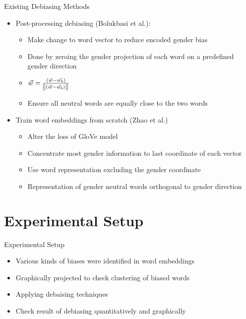 \documentclass{beamer}
\begin{document}
		
		\begin{frame}{Existing Debiasing Methods}
			\begin{itemize}
				\item Post-processing debiasing (Bolukbasi et al.):
				\begin{itemize}
					\item Make change to word vector to reduce encoded gender bias
					\item Done by zeroing the gender projection of each word on a predefined gender direction
					\item $\vec{w} = \frac{(\vec{w} - \vec{w_b})}{\norm{(\vec{w} - \vec{w_b})}}$
					\item Ensure all neutral words are equally close to the two words
				\end{itemize}
				\item Train word embeddings from scratch (Zhao et al.)
				\begin{itemize}
					\item Alter the loss of GloVe model
					\item Concentrate most gender information to last coordinate of each vector
					\item Use word representation excluding the gender coordinate
					\item Representation of gender neutral words orthogonal to gender direction
				\end{itemize}
			\end{itemize}
		\end{frame}
	
	
	
	\section{Experimental Setup}
	\begin{frame}{Experimental Setup}
		\begin{itemize}
			\item Various kinds of biases were identified in word embeddings
			\item Graphically projected to check clustering of biased words
			\item Applying debaising techniques
			\item Check result of debiasing quantitatively and graphically
		\end{itemize}
	\end{frame}
	
	
\end{document}
